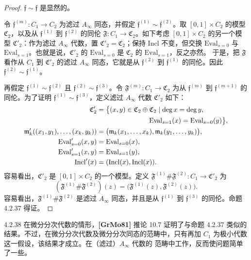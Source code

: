 \begin{proof}
$\mathfrak f\sim\mathfrak f$ 是显然的。

令 $\mathfrak f^{(m)}\colon C_1\to C_2$ 为滤过 $A_\infty$ 同态，并假定
$\mathfrak f^{(1)}\sim\mathfrak f^{(2)}$。取 $[0,1]\times C_2$ 的模型
$\mathfrak C_2$，以及从 $\mathfrak f^{(1)}$ 到 $\mathfrak f^{(2)}$ 的同伦
$\mathfrak F\colon C_1\to\mathfrak C_2$。如下考虑
$[0,1]\times C_2$ 的另一个模型 $\mathfrak C'_2$：作为滤过
$A_\infty$ 代数，置 $\mathfrak C'_2=\mathfrak C_2$；保持
$\mathrm{Incl}$ 不变，但交换 $\mathrm{Eval}_{s=0}$ 与
$\mathrm{Eval}_{s=1}$。也就是说，$\mathfrak C'_2$ 的
$\mathrm{Eval}_{s=0}$ 是 $\mathfrak C_2$ 的 $\mathrm{Eval}_{s=1}$，反之亦然。
于是，把 $\mathfrak F$ 看作从 $C_1$ 到 $\mathfrak C'_2$ 的滤过
$A_\infty$ 同态，它就是从 $\mathfrak f^{(2)}$ 到
$\mathfrak f^{(1)}$ 的同伦。因此
$\mathfrak f^{(2)}\sim\mathfrak f^{(1)}$。

再假定 $\mathfrak f^{(1)}\sim\mathfrak f^{(2)}$ 且
$\mathfrak f^{(2)}\sim\mathfrak f^{(3)}$。令
$\mathfrak F^{(m)}\colon C_1\to\mathfrak C_2$ 为从
$\mathfrak f^{(m)}$ 到 $\mathfrak f^{(m+1)}$ 的同伦。为了证明
$\mathfrak f^{(1)}\sim\mathfrak f^{(3)}$，定义滤过 $A_\infty$ 代数
$\mathfrak C'_2$ 如下：
{\small
\[
\begin{aligned}
 \mathfrak C'_2
  &={\bigl\{}(x,y)\in\mathfrak C_2\oplus\mathfrak C_2
    \mid \deg x=\deg y,\\
  &\hspace{7.7em}
    \mathrm{Eval}_{s=1}(x)=\mathrm{Eval}_{s=0}(y){\bigr\}},\\
 \mathfrak m'_k((x_1,y_1),\ldots,(x_k,y_k))
  &=\bigl(\mathfrak m_k(x_1,\ldots,x_k),
           \mathfrak m_k(y_1,\ldots,y_k)\bigr),\\
 \mathrm{Eval}'_{s=0}(x,y)&=\mathrm{Eval}_{s=0}(x),\\
 \mathrm{Eval}'_{s=1}(x,y)&=\mathrm{Eval}_{s=1}(y),\\
 \mathrm{Incl}'(x)&=(\mathrm{Incl}(x),\mathrm{Incl}(x)).
\end{aligned}
\]
}
容易看出，$\mathfrak C'_2$ 是 $[0,1]\times C_2$ 的一个模型。定义
$\mathfrak F^{(1)}\#\mathfrak F^{(2)}\colon C_1\to\mathfrak C'_2$ 为
\[
 (\mathfrak F^{(1)}\#\mathfrak F^{(2)})(z)
 =\bigl(\mathfrak F^{(1)}(z),\mathfrak F^{(2)}(z)\bigr).
\]
容易看出，$\mathfrak F^{(1)}\#\mathfrak F^{(2)}$ 是滤过
$A_\infty$ 同态，并且是从 $\mathfrak f^{(1)}$ 到
$\mathfrak f^{(3)}$ 的同伦。命题 4.2.37 得证。
\end{proof}

\begin{remark}{4.2.38}\label{rem:4-2-38}
在微分分次代数的情形，\textbf{[GrMo81]} 推论 10.7 证明了与命题
4.2.37 类似的结果。不过，在微分分次代数及微分分次同态的范畴中，只有再加
$C_1$ 为极小代数这一假设，该结果才成立。在（滤过）$A_\infty$ 代数的
范畴中工作，反而使问题简单了一些。
\end{remark}

